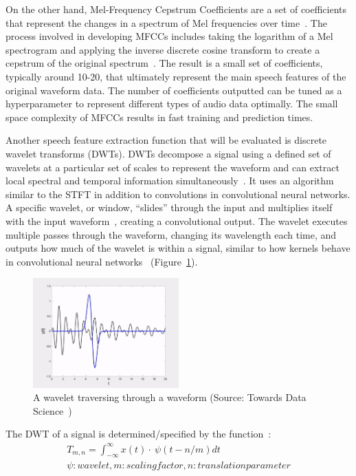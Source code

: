 On the other hand, Mel-Frequency Cepstrum Coefficients are a set of coefficients that represent the changes in a spectrum of Mel frequencies over time~\cite{janse_magre_kurzekar_deshmukh_2014}. The process involved in developing MFCCs includes taking the logarithm of a Mel spectrogram and applying the inverse discrete cosine transform to create a cepstrum of the original spectrum~\cite{singh_2019}. The result is a small set of coefficients, typically around 10-20, that ultimately represent the main speech features of the original waveform data. The number of coefficients outputted can be tuned as a hyperparameter to represent different types of audio data optimally. The small space complexity of MFCCs results in fast training and prediction times.
\par
Another speech feature extraction function that will be evaluated is discrete wavelet transforms (DWTs). DWTs decompose a signal using a defined set of wavelets at a particular set of scales to represent the waveform and can extract local spectral and temporal information simultaneously~\cite{nechyba_2004,talebi_2022}. It uses an algorithm similar to the STFT in addition to convolutions in convolutional neural networks. A specific wavelet, or window, “slides” through the input and multiplies itself with the input waveform~\cite{talebi_2022,nehe_holambe_2012}, creating a convolutional output. The wavelet executes multiple passes through the waveform, changing its wavelength each time, and outputs how much of the wavelet is within a signal, similar to how kernels behave in convolutional neural networks~\cite{nehe_holambe_2012} (Figure~\ref{fig:DWT}).

\begin{figure}[th]
    \centering
    \includegraphics[width=0.5\textwidth]{Figures/dwt.png}
    \decoRule
    \caption[DWT]{A wavelet traversing through a waveform (Source: Towards Data Science~\cite{talebi_2022})}
    \label{fig:DWT}
\end{figure}

The DWT of a signal is determined/specified by the function~\cite{nehe_holambe_2012}:
\begin{gather*}
    T_{m,n}=\int_{-\infty}^{\infty}x(t)\cdot~\psi({t-n}/m) dt\\
    \psi: wavelet, m: scaling factor, n: translation parameter
\end{gather*}